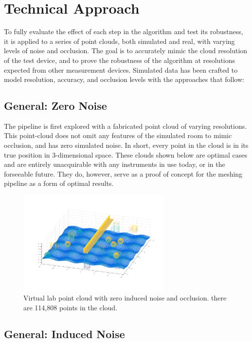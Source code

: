 \documentclass[12pt]{drexelthesis}
\let\Oldsection\section
\renewcommand{\section}{\FloatBarrier\Oldsection}
\let\Oldsubsection\subsection
\renewcommand{\subsection}{\FloatBarrier\Oldsubsection}
\begin{document}
\section{Technical Approach}
To fully evaluate the effect of each step in the algorithm and test its robustness, it is applied to a series of point clouds, both simulated and real, with varying levels of noise and occlusion. The goal is to accurately mimic the cloud resolution of the test device, and to prove the robustness of the algorithm at resolutions expected from other measurement devices. Simulated data has been crafted to model resolution, accuracy, and occlusion levels with the approaches that follow:

\subsection{General: Zero Noise}
The pipeline is first explored with a fabricated point cloud of varying resolutions. This point-cloud does not omit any features of the simulated room to mimic occlusion, and has zero simulated noise. In short, every point in the cloud is in its true position in 3-dimensional space. These clouds shown below are optimal cases and are entirely unacquirable with any instruments in use today, or in the forseeable future. They do, however, serve as a proof of concept for the meshing pipeline as a form of optimal results.

\begin{figure}[!ht]
	\centering
	\includegraphics[width=3in]{simulated-lab-scan/full_noiseless_cloud.png}
	\caption[Simulated high density lab point cloud ]{\centering Virtual lab point cloud with zero induced noise and occlusion. there are 114,808 points in the cloud.}
	\label{sim:noiselessdense}
\end{figure}


\subsection{General: Induced Noise}
\end{document}
